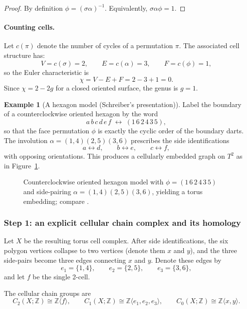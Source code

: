 \documentclass[11pt,oneside]{amsbook}
\numberwithin{equation}{section}
\theoremstyle{plain}
\theoremstyle{definition}
\newtheorem{example}[theorem]{Example}
\theoremstyle{remark}
\newcommand{\Z}{\mathbb{Z}}
\begin{document}
\begin{proof}
By definition $\phi=(\sigma\alpha)^{-1}$.
Equivalently, $\sigma\alpha\phi=1$.
\end{proof}

\paragraph{Counting cells.}
Let $c(\pi)$ denote the number of cycles of a permutation $\pi$.
The associated cell structure has:
\[
V=c(\sigma)=2,\qquad E=c(\alpha)=3,\qquad F=c(\phi)=1,
\]
so the Euler characteristic is
\[
\chi = V-E+F = 2-3+1=0.
\]
Since $\chi=2-2g$ for a closed oriented surface, the genus is $g=1$.

\begin{example}[A hexagon model (Schreiber's presentation)]
Label the boundary of a counterclockwise oriented hexagon by the word
\[
a\,b\,c\,d\,e\,f \;\longleftrightarrow\; (1\,6\,2\,4\,3\,5),
\]
so that the face permutation $\phi$ is exactly the cyclic order of the boundary darts.
The involution $\alpha=(1,4)(2,5)(3,6)$ prescribes the side identifications
\[
a\leftrightarrow d,\qquad b\leftrightarrow e,\qquad c\leftrightarrow f,
\]
with opposing orientations.
This produces a cellularly embedded graph on $T^2$ as in Figure~\ref{fig:schreiber_torus_hexagon}.
\end{example}

\begin{figure}[t]
\centering
\caption{Counterclockwise oriented hexagon model with $\phi=(1\,6\,2\,4\,3\,5)$ and side-pairing $\alpha=(1,4)(2,5)(3,6)$, yielding a torus embedding; compare \cite{Schreiber2018SurfaceAlgebrasI}.}
\label{fig:schreiber_torus_hexagon}
\end{figure}

\subsubsection{Step 1: an explicit cellular chain complex and its homology}

Let $X$ be the resulting torus cell complex.
After side identifications, the six polygon vertices collapse to two vertices (denote them $x$ and $y$), and the three side-pairs become three edges connecting $x$ and $y$.
Denote these edges by
\[
e_1=\{1,4\},\qquad e_2=\{2,5\},\qquad e_3=\{3,6\},
\]
and let $f$ be the single 2-cell.

The cellular chain groups are
\[
C_2(X;\Z)\cong \Z\langle f\rangle,\qquad C_1(X;\Z)\cong \Z\langle e_1,e_2,e_3\rangle,\qquad C_0(X;\Z)\cong \Z\langle x,y\rangle.
\]
\end{document}
